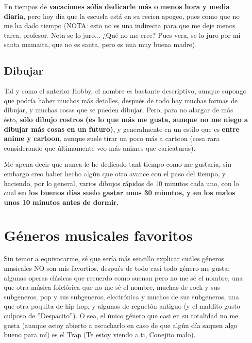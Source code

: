 \documentclass[12pt,letterpaper]{article}
\begin{document}
{\textsf{En tiempos de {\large{\textbf{vacaciones sólia dedicarle más o menos hora y media diaria}}}, pero hoy día que la escuela está en su recien apogeo, pues como que no me ha dado tiempo (NOTA: esto no es una indirecta para que me deje menos tarea, profesor. Neta se lo juro... ¿Qué no me cree? Pues vera, se lo juro por mi santa mamaita, que no es santa, pero es una muy buena madre).}}

    \subsection{\huge{Dibujar}}

{\textsf{Tal y como el anterior Hobby, el nombre es bastante descriptivo, aunque supongo que podría haber muchos más detalles, después de todo hay muchas formas de dibujar, y muchas cosas que se pueden dibujar. Pero, para no alargar de más ésto, {\large{\textbf{sólo dibujo rostros (es lo que más me gusta, aunque no me niego a dibujar más cosas en un futuro)}}}, y generalmente en un estilo que es {\large{\textbf{entre anime y cartoon}}}, aunque suele tirar un poco más a cartoon (cosa rara considerando que últimamente veo más animes que caricaturas).\\}}

{\textsf{Me apena decir que nunca le he dedicado tant tiempo como me gustaría, sin embargo creo haber hecho algún que otro avance con el paso del tiempo, y haciendo, por lo general, varios dibujos rápidos de 10 minutos cada uno, con lo cual {\large{\textbf{en los buenos días suelo gastar unos 30 minutos, y en los malos unos 10 minutos antes de dormir.}}}}} 

\section{\Huge{\textbf{Géneros musicales favoritos}}}

{\textrm{Sin temor a equivocarme, sé que sería más sencillo explicar cuáles géneros musicales NO son mis favortios, después de todo casi todo género me gusta: algunas operas clásicas que recuerdo como suenan pero no me sé el nombre, una que otra música folclórica que no me sé el nombre, muchas de rock y sus subgeneros, pop y sus subgeneros, electrónica y muchos de sus subgeneros, una que otra poquita de hip hop, y algunas de reguetón antiguo (y el maldito gusto culposo de ''Despacito''). O sea, el único género que casi en su totalidad no me gusta (aunque estoy abierto a escucharlo en caso de que algún día saquen algo bueno para mí) es el Trap (Te estoy viendo a ti, Conejito malo).\\}}
\end{document}
